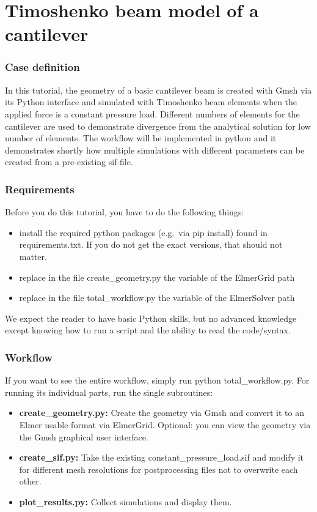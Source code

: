 \chapter{Timoshenko beam model of a cantilever}


\subsection*{Case definition}

In this tutorial, the geometry of a basic cantilever beam is created with Gmsh via its Python interface and simulated with Timoshenko beam elements when the applied force is a constant pressure load. Different numbers of elements for the cantilever are used to demonstrate divergence from the analytical solution for low number of elements. The workflow will be implemented in python and it demonstrates shortly how multiple simulations with different parameters can be created from a pre-existing sif-file.

\subsection*{Requirements}

Before you do this tutorial, you have to do the following things:
\begin{itemize}
   \item install the required python packages (e.g.\ via pip install) found in requirements.txt. If you do not get the exact versions, that should not matter. 
   \item replace in the file create\_geometry.py the variable of the ElmerGrid path
   \item replace in the file total\_workflow.py the variable of the ElmerSolver path
\end{itemize}
We expect the reader to have basic Python skills, but no advanced knowledge except knowing how to run a script and the ability to read the code/syntax.

\subsection*{Workflow}

If you want to see the entire workflow, simply run python total\_workflow.py.  For running its individual parts, run the single subroutines:
\begin{itemize}
    \item \textbf{create\_geometry.py:} Create the geometry via Gmsh and convert it to an Elmer usable format via ElmerGrid. Optional: you can view the geometry via the Gmsh graphical user interface.
    \item \textbf{create\_sif.py:} Take the existing constant\_pressure\_load.sif and modify it for different mesh resolutions for postprocessing files not to overwrite each other.
    \item \textbf{plot\_results.py:} Collect simulations and display them.
\end{itemize}

